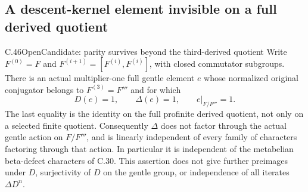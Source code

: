 \subsection{A descent-kernel element invisible on a full derived quotient}

\begin{statement}{C.46}{Open}{Candidate: parity survives beyond the third-derived quotient}
Write $F^{(0)}=F$ and $F^{(i+1)}=[F^{(i)},F^{(i)}]$, with
closed commutator subgroups. There is an actual multiplier-one full
gentle element $e$ whose normalized original conjugator belongs to
$F^{(3)}=F'''$ and for which
\[
 D(e)=1,\qquad \Delta(e)=1,\qquad
 e|_{F/F'''}=1.                                      \tag{C.46.1}
\]
The last equality is the identity on the full profinite derived quotient,
not only on a selected finite quotient. Consequently $\Delta$ does not
factor through the actual gentle action on $F/F'''$, and is linearly
independent of every family of characters factoring through that action.
In particular it is independent of the metabelian beta-defect characters
of C.30. This assertion does not give further preimages under $D$,
surjectivity of $D$ on the gentle group, or independence of all iterates
$\Delta D^n$.
\end{statement}

